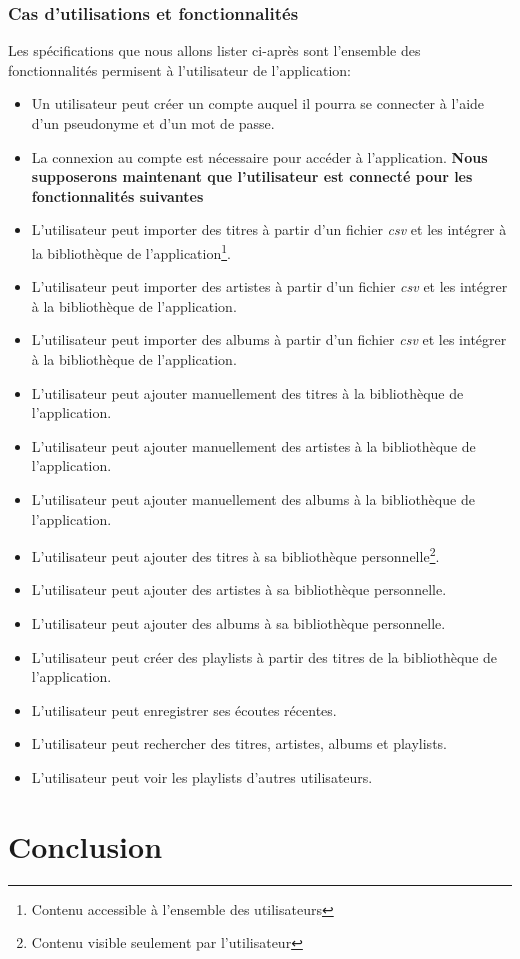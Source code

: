 \documentclass[a4paper,10pt, french]{report}
\begin{document}
  \subsection{Cas d'utilisations et fonctionnalités}
    Les spécifications que nous allons lister ci-après sont l'ensemble des fonctionnalités permisent à l'utilisateur de l'application:
    \begin{itemize}
      \item Un utilisateur peut créer un compte auquel il pourra se connecter à l'aide d'un pseudonyme et d'un mot de passe.
      \item La connexion au compte est nécessaire pour accéder à l'application. \newline
        \textbf{Nous supposerons maintenant que l'utilisateur est connecté pour les fonctionnalités suivantes}
      \item L'utilisateur peut importer des titres à partir d'un fichier \emph{csv} et les intégrer à la bibliothèque de l'application\footnote{Contenu accessible à l'ensemble des utilisateurs}.
      \item L'utilisateur peut importer des artistes à partir d'un fichier \emph{csv} et les intégrer à la bibliothèque de l'application.
      \item L'utilisateur peut importer des albums à partir d'un fichier \emph{csv} et les intégrer à la bibliothèque de l'application.
      \item L'utilisateur peut ajouter manuellement des titres à la bibliothèque de l'application.
      \item L'utilisateur peut ajouter manuellement des artistes à la bibliothèque de l'application.
      \item L'utilisateur peut ajouter manuellement des albums à la bibliothèque de l'application.
      \item L'utilisateur peut ajouter des titres à sa bibliothèque personnelle\footnote{Contenu visible seulement par l'utilisateur}.
      \item L'utilisateur peut ajouter des artistes à sa bibliothèque personnelle.
      \item L'utilisateur peut ajouter des albums à sa bibliothèque personnelle.
      \item L'utilisateur peut créer des playlists à partir des titres de la bibliothèque de l'application.
      \item L'utilisateur peut enregistrer ses écoutes récentes.
      \item L'utilisateur peut rechercher des titres, artistes, albums et playlists.
      \item L'utilisateur peut voir les playlists d'autres utilisateurs.
    \end{itemize}


\chapter*{Conclusion}
\end{document}
